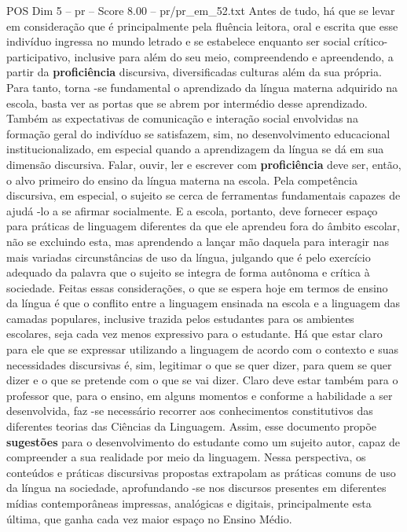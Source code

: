 \begin{textsample}{POS Dim 5 – pr – Score 8.00 – pr/pr\_em\_52.txt}
Antes de tudo, há que se levar em consideração que é principalmente pela fluência leitora, oral e escrita que esse indivíduo ingressa no mundo letrado e se estabelece enquanto ser social crítico-participativo, inclusive para além do seu meio, compreendendo e apreendendo, a partir da \textbf{proficiência} discursiva, diversificadas culturas além da sua própria.
Para tanto, torna -se fundamental o aprendizado da língua materna adquirido na escola, basta ver as portas que se abrem por intermédio desse aprendizado.
Também as expectativas de comunicação e interação social envolvidas na formação geral do indivíduo se satisfazem, sim, no desenvolvimento educacional institucionalizado, em especial quando a aprendizagem da língua se dá em sua dimensão discursiva.
Falar, ouvir, ler e escrever com \textbf{proficiência} deve ser, então, o alvo primeiro do ensino da língua materna na escola.
Pela competência discursiva, em especial, o sujeito se cerca de ferramentas fundamentais capazes de ajudá -lo a se afirmar socialmente.
E a escola, portanto, deve fornecer espaço para práticas de linguagem diferentes da que ele aprendeu fora do âmbito escolar, não se excluindo esta, mas aprendendo a lançar mão daquela para interagir nas mais variadas circunstâncias de uso da língua, julgando que é pelo exercício adequado da palavra que o sujeito se integra de forma autônoma e crítica à sociedade.
Feitas essas considerações, o que se espera hoje em termos de ensino da língua é que o conflito entre a linguagem ensinada na escola e a linguagem das camadas populares, inclusive trazida pelos estudantes para os ambientes escolares, seja cada vez menos expressivo para o estudante.
Há que estar claro para ele que se expressar utilizando a linguagem de acordo com o contexto e suas necessidades discursivas é, sim, legitimar o que se quer dizer, para quem se quer dizer e o que se pretende com o que se vai dizer.
Claro deve estar também para o professor que, para o ensino, em alguns momentos e conforme a habilidade a ser desenvolvida, faz -se necessário recorrer aos conhecimentos constitutivos das diferentes teorias das Ciências da Linguagem.
Assim, esse documento propõe \textbf{sugestões} para o desenvolvimento do estudante como um sujeito autor, capaz de compreender a sua realidade por meio da linguagem.
Nessa perspectiva, os conteúdos e práticas discursivas propostas extrapolam as práticas comuns de uso da língua na sociedade, aprofundando -se nos discursos presentes em diferentes mídias contemporâneas impressas, analógicas e digitais, principalmente esta última, que ganha cada vez maior espaço no Ensino Médio.

\end{textsample}

